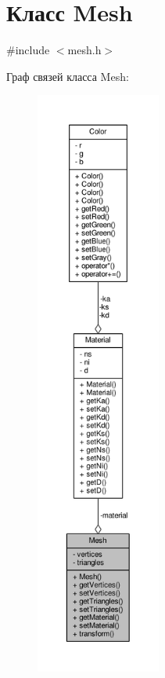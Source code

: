 \hypertarget{class_mesh}{}\section{Класс Mesh}
\label{class_mesh}


{\ttfamily \#include $<$mesh.\+h$>$}



Граф связей класса Mesh\+:
\nopagebreak
\begin{figure}[H]
\begin{center}
\leavevmode
\includegraphics[height=550pt]{d8/d43/class_mesh__coll__graph}
\end{center}
\end{figure}
